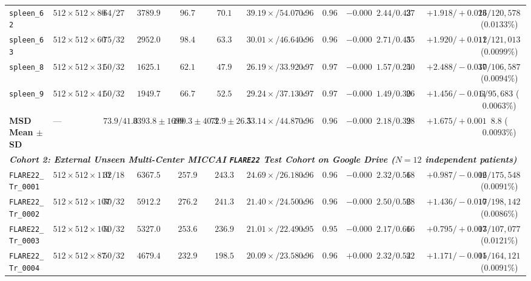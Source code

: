 \documentclass[10pt,twocolumn]{article}
\begin{document}
\begin{table}[t]
{\begin{tabular}{llcccccccccccc}
\texttt{spleen\_62} & $512 \times 512 \times 80$ & $64 / 27$ & $3789.9$ & $96.7$ & $70.1$ & $39.19\times / 54.07\times$ & $0.961134$ & $0.961119$ & $-0.000015$ & $2.44 / 0.43$ & $275.93$ & $+1.918 / +0.023$ & $16 / 120,578$ ($0.0133\%$) \\
\texttt{spleen\_63} & $512 \times 512 \times 60$ & $75 / 32$ & $2952.0$ & $98.4$ & $63.3$ & $30.01\times / 46.64\times$ & $0.963625$ & $0.963618$ & $-0.000007$ & $2.71 / 0.45$ & $356.60$ & $+1.920 / +0.011$ & $12 / 121,013$ ($0.0099\%$) \\
\texttt{spleen\_8} & $512 \times 512 \times 31$ & $50 / 32$ & $1625.1$ & $62.1$ & $47.9$ & $26.19\times / 33.92\times$ & $0.973413$ & $0.973384$ & $-0.000029$ & $1.57 / 0.24$ & $501.55$ & $+2.488 / -0.037$ & $10 / 106,587$ ($0.0094\%$) \\
\texttt{spleen\_9} & $512 \times 512 \times 41$ & $50 / 32$ & $1949.7$ & $66.7$ & $52.5$ & $29.24\times / 37.13\times$ & $0.970787$ & $0.970786$ & $-0.000001$ & $1.49 / 0.30$ & $269.15$ & $+1.456 / -0.011$ & $6 / 95,683$ ($0.0063\%$) \\
\textbf{MSD Mean $\pm$ SD} & --- & $73.9 / 41.0$ & $3393.8 \pm 1699$ & $100.3 \pm 40.3$ & $72.9 \pm 26.5$ & $\mathbf{33.14\times} / \mathbf{44.87\times}$ & $0.965233$ & $\mathbf{0.965229}$ & $-0.000004$ & $\mathbf{2.18 / 0.39}$ & $286.73$ & $\mathbf{+1.675 / +0.001}$ & $\mathbf{8.8}$ ($\mathbf{0.0093\%}$) \\
\midrule
\multicolumn{14}{l}{\textit{\textbf{Cohort 2: External Unseen Multi-Center MICCAI \texttt{FLARE22} Test Cohort on Google Drive ($N = 12$ independent patients)}}}\\
\texttt{FLARE22\_Tr\_0001} & $512 \times 512 \times 110$ & $32 / 18$ & $6367.5$ & $257.9$ & $243.3$ & $24.69\times / 26.18\times$ & $0.961213$ & $0.961207$ & $-0.000006$ & $2.32 / 0.56$ & $186.17$ & $+0.987 / -0.002$ & $16 / 175,548$ ($0.0091\%$) \\
\texttt{FLARE22\_Tr\_0002} & $512 \times 512 \times 107$ & $50 / 32$ & $5912.2$ & $276.2$ & $241.3$ & $21.40\times / 24.50\times$ & $0.964399$ & $0.964395$ & $-0.000004$ & $2.50 / 0.56$ & $281.25$ & $+1.436 / -0.010$ & $17 / 198,142$ ($0.0086\%$) \\
\texttt{FLARE22\_Tr\_0003} & $512 \times 512 \times 101$ & $50 / 32$ & $5327.0$ & $253.6$ & $236.9$ & $21.01\times / 22.49\times$ & $0.955464$ & $0.955433$ & $-0.000031$ & $2.17 / 0.66$ & $163.03$ & $+0.795 / +0.007$ & $13 / 107,077$ ($0.0121\%$) \\
\texttt{FLARE22\_Tr\_0004} & $512 \times 512 \times 87$ & $50 / 32$ & $4679.4$ & $232.9$ & $198.5$ & $20.09\times / 23.58\times$ & $0.960944$ & $0.960946$ & $+0.000002$ & $2.32 / 0.54$ & $222.10$ & $+1.171 / -0.001$ & $15 / 164,121$ ($0.0091\%$) \\

\end{tabular}}
\end{table}
\end{document}

